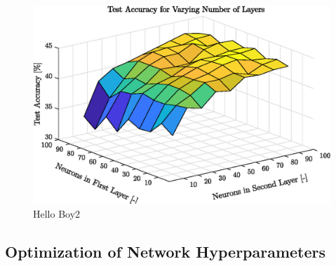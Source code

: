 \begin{figure}[h!]
    \centering
    \includegraphics{images/surfacelayers}
   	\caption{Hello Boy2}
   	\label{fig:surfaceLayers}
\end{figure}

\FloatBarrier

\subsection{Optimization of Network Hyperparameters}\label{subsec:optNet}

